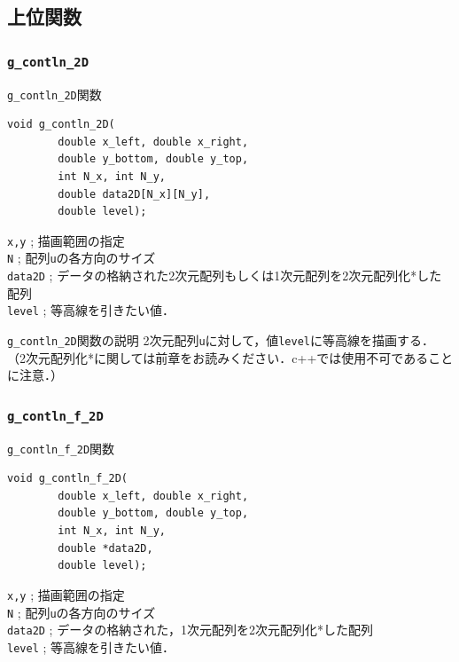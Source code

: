 \documentclass[platex,a4paper,12pt]{jsarticle}%
\begin{document}
\clearpage
\subsection{上位関数}

\subsubsection{\texttt{g\_contln\_2D}}

\begin{itembox}[l]{\texttt{g\_contln\_2D}関数}
\begin{verbatim}
void g_contln_2D(
        double x_left, double x_right,
        double y_bottom, double y_top,
        int N_x, int N_y,
        double data2D[N_x][N_y],
        double level);
\end{verbatim}
\verb|x,y| ; 描画範囲の指定\\
\verb|N| ; 配列\verb|u|の各方向のサイズ\\
\verb|data2D| ; データの格納された2次元配列もしくは1次元配列を2次元配列化*した配列\\
\verb|level| ; 等高線を引きたい値．
\end{itembox}

\begin{itembox}[l]{\texttt{g\_contln\_2D}関数の説明}
2次元配列\verb|u|に対して，値\verb|level|に等高線を描画する．
（2次元配列化*に関しては前章をお読みください．c++では使用不可であることに注意．）
\end{itembox}

\begin{figure}[htb]
\end{figure}




\clearpage
\subsubsection{\texttt{g\_contln\_f\_2D}}

\begin{itembox}[l]{\texttt{g\_contln\_f\_2D}関数}
\begin{verbatim}
void g_contln_f_2D(
        double x_left, double x_right,
        double y_bottom, double y_top,
        int N_x, int N_y,
        double *data2D,
        double level);
\end{verbatim}
\verb|x,y| ; 描画範囲の指定\\
\verb|N| ; 配列\verb|u|の各方向のサイズ\\
\verb|data2D| ; データの格納された，1次元配列を2次元配列化*した配列\\
\verb|level| ; 等高線を引きたい値．
\end{itembox}
\end{document}
